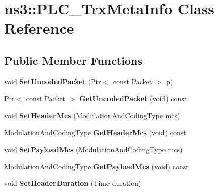 \hypertarget{classns3_1_1PLC__TrxMetaInfo}{\section{ns3\-:\-:\-P\-L\-C\-\_\-\-Trx\-Meta\-Info \-Class \-Reference}
\label{classns3_1_1PLC__TrxMetaInfo}
}
\subsection*{\-Public \-Member \-Functions}
\begin{DoxyCompactItemize}
\item 
\hypertarget{classns3_1_1PLC__TrxMetaInfo_a402652c9d491f4031b5398dfd0abc5ca}{void {\bfseries \-Set\-Uncoded\-Packet} (\-Ptr$<$ const \-Packet $>$ p)}\label{classns3_1_1PLC__TrxMetaInfo_a402652c9d491f4031b5398dfd0abc5ca}

\item 
\hypertarget{classns3_1_1PLC__TrxMetaInfo_a140172d44065273da021a45c0fb91c00}{\-Ptr$<$ const \-Packet $>$ {\bfseries \-Get\-Uncoded\-Packet} (void) const }\label{classns3_1_1PLC__TrxMetaInfo_a140172d44065273da021a45c0fb91c00}

\item 
\hypertarget{classns3_1_1PLC__TrxMetaInfo_a88c8d81c8aedb3146052f6f1caf31fc1}{void {\bfseries \-Set\-Header\-Mcs} (\-Modulation\-And\-Coding\-Type mcs)}\label{classns3_1_1PLC__TrxMetaInfo_a88c8d81c8aedb3146052f6f1caf31fc1}

\item 
\hypertarget{classns3_1_1PLC__TrxMetaInfo_a05f0faf3b7efd534863952652658b29b}{\-Modulation\-And\-Coding\-Type {\bfseries \-Get\-Header\-Mcs} (void) const }\label{classns3_1_1PLC__TrxMetaInfo_a05f0faf3b7efd534863952652658b29b}

\item 
\hypertarget{classns3_1_1PLC__TrxMetaInfo_a747656c0bcf8b7eb03c4485122052c53}{void {\bfseries \-Set\-Payload\-Mcs} (\-Modulation\-And\-Coding\-Type mcs)}\label{classns3_1_1PLC__TrxMetaInfo_a747656c0bcf8b7eb03c4485122052c53}

\item 
\hypertarget{classns3_1_1PLC__TrxMetaInfo_a430eb4934e82ee8678b6168d97c9639a}{\-Modulation\-And\-Coding\-Type {\bfseries \-Get\-Payload\-Mcs} (void) const }\label{classns3_1_1PLC__TrxMetaInfo_a430eb4934e82ee8678b6168d97c9639a}

\item 
\hypertarget{classns3_1_1PLC__TrxMetaInfo_a1210dfb0c748932aafa45c1db399016b}{void {\bfseries \-Set\-Header\-Duration} (\-Time duration)}\label{classns3_1_1PLC__TrxMetaInfo_a1210dfb0c748932aafa45c1db399016b}


\end{DoxyCompactItemize}
